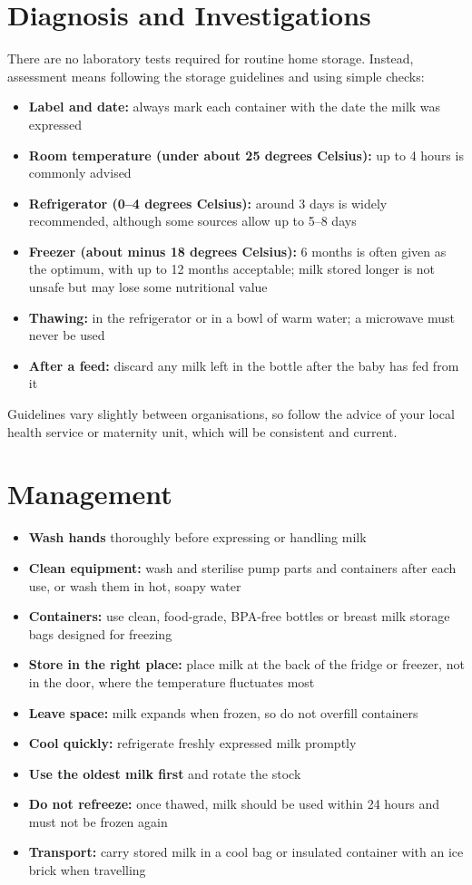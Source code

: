 \section*{Diagnosis and Investigations}
There are no laboratory tests required for routine home storage. Instead, assessment means following the storage guidelines and using simple checks:

\begin{itemize}
    \item \textbf{Label and date:} always mark each container with the date the milk was expressed
    \item \textbf{Room temperature (under about 25 degrees Celsius):} up to 4 hours is commonly advised
    \item \textbf{Refrigerator (0--4 degrees Celsius):} around 3 days is widely recommended, although some sources allow up to 5--8 days
    \item \textbf{Freezer (about minus 18 degrees Celsius):} 6 months is often given as the optimum, with up to 12 months acceptable; milk stored longer is not unsafe but may lose some nutritional value
    \item \textbf{Thawing:} in the refrigerator or in a bowl of warm water; a microwave must never be used
    \item \textbf{After a feed:} discard any milk left in the bottle after the baby has fed from it
\end{itemize}

Guidelines vary slightly between organisations, so follow the advice of your local health service or maternity unit, which will be consistent and current.

\section*{Management}
\begin{itemize}
    \item \textbf{Wash hands} thoroughly before expressing or handling milk
    \item \textbf{Clean equipment:} wash and sterilise pump parts and containers after each use, or wash them in hot, soapy water
    \item \textbf{Containers:} use clean, food-grade, BPA-free bottles or breast milk storage bags designed for freezing
    \item \textbf{Store in the right place:} place milk at the back of the fridge or freezer, not in the door, where the temperature fluctuates most
    \item \textbf{Leave space:} milk expands when frozen, so do not overfill containers
    \item \textbf{Cool quickly:} refrigerate freshly expressed milk promptly
    \item \textbf{Use the oldest milk first} and rotate the stock
    \item \textbf{Do not refreeze:} once thawed, milk should be used within 24 hours and must not be frozen again
    \item \textbf{Transport:} carry stored milk in a cool bag or insulated container with an ice brick when travelling
\end{itemize}

